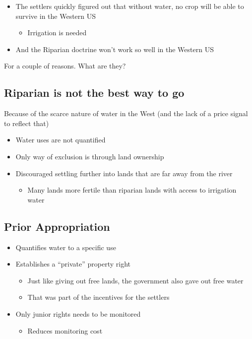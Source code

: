\documentclass[]{article}
\providecommand{\tightlist}{%
  \setlength{\itemsep}{0pt}\setlength{\parskip}{0pt}}
\begin{document}
\begin{itemize}
\tightlist
\item
  The settlers quickly figured out that without water, no crop will be
  able to survive in the Western US

  \begin{itemize}
  \tightlist
  \item
    Irrigation is needed
  \end{itemize}
\item
  And the Riparian doctrine won't work so well in the Western US
\end{itemize}

For a couple of reasons. What are they?

\hypertarget{riparian-is-not-the-best-way-to-go}{%
\subsection{Riparian is not the best way to
go}\label{riparian-is-not-the-best-way-to-go}}

Because of the scarce nature of water in the West (and the lack of a
price signal to reflect that)

\begin{itemize}
\tightlist
\item
  Water uses are not quantified
\item
  Only way of exclusion is through land ownership
\item
  Discouraged settling further into lands that are far away from the
  river

  \begin{itemize}
  \tightlist
  \item
    Many lands more fertile than riparian lands with access to
    irrigation water
  \end{itemize}
\end{itemize}

\hypertarget{prior-appropriation}{%
\subsection{Prior Appropriation}\label{prior-appropriation}}

\begin{itemize}
\tightlist
\item
  Quantifies water to a specific use
\item
  Establishes a ``private'' property right

  \begin{itemize}
  \tightlist
  \item
    Just like giving out free lands, the government also gave out free
    water
  \item
    That was part of the incentives for the settlers
  \end{itemize}
\item
  Only junior rights needs to be monitored

  \begin{itemize}
  \tightlist
  \item
    Reduces monitoring cost
  \end{itemize}
\end{itemize}
\end{document}
